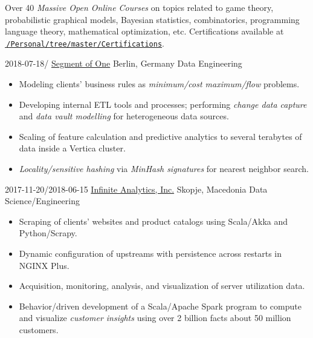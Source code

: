 \documentclass[version=last, fontsize=10pt, paper=A4, toc=bibliography]{scrartcl}%
\begin{document}
\begin{tcolorbox}[size=fbox, fontupper=\small, fontlower=\footnotesize]
  Over \num{40} \emph{Massive Open Online Courses} on topics related to game
  theory, probabilistic graphical models, Bayesian statistics, combinatorics,
  programming language theory, mathematical optimization, etc.%
  \tcblower%
  Certifications available at
  \href{https://github.com/d125q/Personal/tree/master/Certifications}%
  {\faGithub\,\nolinkurl{/Personal/tree/master/Certifications}}.
\end{tcolorbox}

\label{sec:experience}

\WorkEntry%
{2018-07-18/}%
{\href{https://www.so1.ai/en/}{Segment of One}}%
{Berlin, Germany}%
{Data Engineering}%
{%
  \begin{itemize}[noitemsep, leftmargin=*]
  \item Modeling clients' business rules as \emph{minimum\-/cost maximum\-/flow}
    problems.
  \item Developing internal ETL tools and processes; performing \emph{change
      data capture} and \emph{data vault modelling} for heterogeneous data
    sources.
  \item Scaling of feature calculation and predictive analytics to several
    terabytes of data inside a Vertica cluster.
  \item \emph{Locality\-/sensitive hashing} via \emph{MinHash signatures} for
    nearest neighbor search.
  \end{itemize}
}

\WorkEntry%
{2017-11-20/2018-06-15}%
{\href{http://infiniteanalytics.com/}{Infinite Analytics, Inc.}}%
{Skopje, Macedonia}%
{Data Science/Engineering}%
{%
  \begin{itemize}[noitemsep, leftmargin=*]
  \item Scraping of clients' websites and product catalogs using Scala/Akka and
    Python/Scrapy.
  \item Dynamic configuration of upstreams with persistence across restarts in
    NGINX Plus.
  \item Acquisition, monitoring, analysis, and visualization of server
    utilization data.
  \item Behavior\-/driven development of a Scala/Apache Spark program to compute
    and visualize \emph{customer insights} using over \num{2} billion facts
    about \num{50} million customers.
  \end{itemize}%
}
\end{document}
